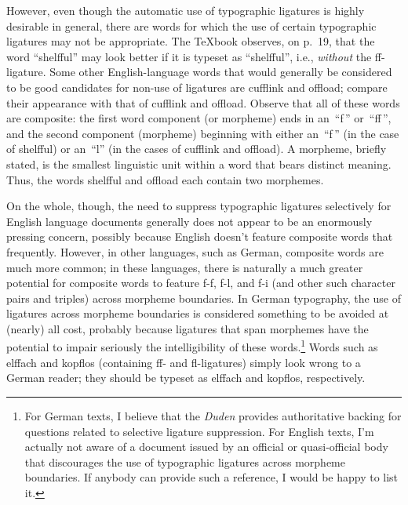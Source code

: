 \documentclass[12pt]{article}
\begin{document}
However, even though the automatic use of typographic ligatures is highly desirable in general, there are words for which the use of certain typographic ligatures may not be appropriate. The \TeX book observes, on p.~19, that the word \enquote{\mbox{shelfful}} may look better if it is typeset as \enquote{shelfful}, i.e., \emph{without} the ff-ligature. Some other English-language words that would generally be considered to be good candidates for non-use of ligatures are \mbox{cufflink} and \mbox{offload}; compare their appearance with that of cufflink and offload. Observe that all of these words are composite: the first word component (or morpheme) ends in an~\enquote{f\,} or~\enquote{ff\,}, and the second component (morpheme) beginning with either an~\enquote{f\,} (in the case of shelfful) or an~\enquote{l} (in the cases of cufflink and offload). A morpheme, briefly stated, is the smallest linguistic unit within a word that bears distinct meaning. Thus, the words shelfful and offload each contain two morphemes. 

On the whole, though, the need to suppress typographic ligatures selectively for English language documents  generally does not appear to be an enormously pressing concern, possibly because English doesn't feature composite words that frequently. However, in other languages, such as German, composite words are much more common; in these languages, there is naturally a much greater potential for composite words to feature f-f, f-l, and f-i (and other such character pairs and triples) across morpheme boundaries. In German typography, the use of ligatures across morpheme boundaries is considered something to be avoided at (nearly) all cost, probably because ligatures that span morphemes have the potential to impair seriously the intelligibility of these words.\footnote{For German texts, I believe that the \emph{Duden} provides authoritative backing for questions related to selective ligature suppression. For English texts, I'm actually not aware of a document issued by an official or quasi-official body that discourages the use of typographic ligatures across morpheme boundaries. If anybody can provide such a reference, I would be happy to list it.} Words such as \mbox{elffach} and \mbox{kopflos}  (containing ff- and fl-ligatures) simply look wrong to a German reader; they should be typeset as elffach and kopflos, respectively.
\end{document}
